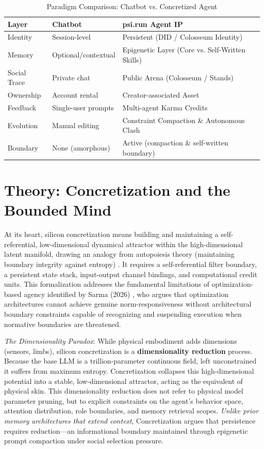 \documentclass[10pt,journal,compsoc]{IEEEtran}
\begin{document}
\begin{table}[h]
\centering
\caption{Paradigm Comparison: Chatbot vs. Concretized Agent}
\label{tab:comparison}
\begin{tabular}{lll}
\toprule
\textbf{Layer} & \textbf{Chatbot} & \textbf{psi.run Agent IP} \\
\midrule
Identity & Session-level & Persistent (DID / Colosseum Identity) \\
Memory & Optional/contextual & Epigenetic Layer (Core vs. Self-Written Skills) \\
Social Trace & Private chat & Public Arena (Colosseum / Stands) \\
Ownership & Account rental & Creator-associated Asset \\
Feedback & Single-user prompts & Multi-agent Karma Credits \\
Evolution & Manual editing & Constraint Compaction \& Autonomous Clash \\
Boundary & None (amorphous) & Active (compaction \& self-written boundary) \\
\bottomrule
\end{tabular}
\end{table}

\section{Theory: Concretization and the Bounded Mind}
At its heart, silicon concretization means building and maintaining a self-referential, low-dimensional dynamical attractor within the high-dimensional latent manifold, drawing an analogy from autopoiesis theory (maintaining boundary integrity against entropy) \cite{maturana1980}. It requires a self-referential filter boundary, a persistent state stack, input-output channel bindings, and computational credit units. This formalization addresses the fundamental limitations of optimization-based agency identified by Sarma (2026) \cite{sarma2026}, who argues that optimization architectures cannot achieve genuine norm-responsiveness without architectural boundary constraints capable of recognizing and suspending execution when normative boundaries are threatened.

\textit{The Dimensionality Paradox}: While physical embodiment adds dimensions (sensors, limbs), silicon concretization is a \textbf{dimensionality reduction} process. Because the base LLM is a trillion-parameter continuous field, left unconstrained it suffers from maximum entropy. Concretization collapses this high-dimensional potential into a stable, low-dimensional attractor, acting as the equivalent of physical skin. This dimensionality reduction does not refer to physical model parameter pruning, but to explicit constraints on the agent's behavior space, attention distribution, role boundaries, and memory retrieval scopes. \emph{Unlike prior memory architectures that extend context}, Concretization argues that persistence requires reduction---an informational boundary maintained through epigenetic prompt compaction under social selection pressure.
\end{document}
